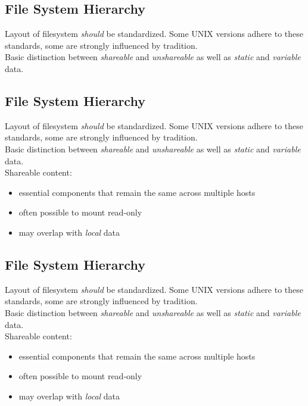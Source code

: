 \documentclass[xga]{xdvislides}
\begin{document}
\subsection{File System Hierarchy}
Layout of filesystem {\em should} be standardized.  Some UNIX versions adhere
to these standards, some are strongly influenced by tradition.
\\

Basic distinction between {\em shareable} and {\em unshareable} as well
as {\em static} and {\em variable} data.

\subsection{File System Hierarchy}
Layout of filesystem {\em should} be standardized.  Some UNIX versions adhere
to these standards, some are strongly influenced by tradition.
\\

Basic distinction between {\em shareable} and {\em unshareable} as well
as {\em static} and {\em variable} data.
\\

Shareable content:
\begin{itemize}
	\item essential components that remain the same across multiple hosts
	\item often possible to mount read-only
	\item may overlap with {\em local} data
\end{itemize}

\subsection{File System Hierarchy}
Layout of filesystem {\em should} be standardized.  Some UNIX versions adhere
to these standards, some are strongly influenced by tradition.
\\

Basic distinction between {\em shareable} and {\em unshareable} as well
as {\em static} and {\em variable} data.
\\

Shareable content:
\begin{itemize}
	\item essential components that remain the same across multiple hosts
	\item often possible to mount read-only
	\item may overlap with {\em local} data
\end{itemize}
\end{document}
